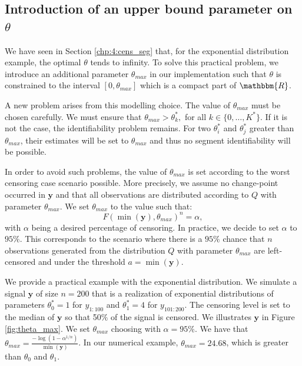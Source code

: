 \subsection{Introduction of an upper bound parameter on $\theta$}

We have seen in Section \ref{chp:4:cens_seg} that, for the exponential distribution example, the optimal $\theta$ tends to infinity. To solve this practical problem, we introduce an additional parameter $\theta_{max}$ in our implementation such that $\theta$ is constrained to the interval $[0,\theta_{max}]$ which is a compact part of $\mathbbm{R}$. 

A new problem arises from this modelling choice. The value of $\theta_{max}$ must be chosen carefully. We must ensure that $\theta_{max}> \theta^*_k,$ for all $k \in \{0,\dots,K^*\}$. If it is not the case, the identifiability problem remains. For two $\theta^*_i$ and $\theta^*_j$  greater than $\theta_{max}$, their estimates will be set to $\theta_{max}$ and thus no segment identifiability will be possible. 

In order to avoid such problems, the value of $\theta_{max}$ is set according to the worst censoring case scenario possible. More precisely, we assume no change-point occurred in $\bm y$ and that all observations are distributed according to $Q$ with parameter $\theta_{max}$. We set $\theta_{max}$ to the value such that: 
\begin{equation}
F(\min(\bm y),\theta_{max})^n = \alpha,
\end{equation}
with $\alpha$ being a desired percentage of censoring. In practice, we decide to set $\alpha$ to $95\%$. This corresponds to the scenario where there is a $95\%$ chance that $n$ observations generated from the distribution $Q$ with parameter $\theta_{max}$ are left-censored and under the threshold $a = \min(\bm y)$. 

We provide a practical example with the exponential distribution. We simulate a signal $\bm y$ of size $n = 200$ that is a realization of exponential distributions of parameters $\theta^*_0 = 1$ for $y_{1:100}$ and $\theta^*_1 = 4$ for $y_{101:200}$. The censoring level is set to the median of $\bm y$ so that 50$\%$ of the signal is censored. We illustrates $\bm y$ in Figure \ref{fig:theta_max}. We set $\theta_{max}$ choosing with $\alpha = 95\%$. We have that $\theta_{max} = \frac{-\log(1-\alpha^{1/n})}{\min(\bm y)}$. In our numerical example, $\theta_{max} = 24.68$, which is greater than $\theta_0$ and $\theta_1$.

